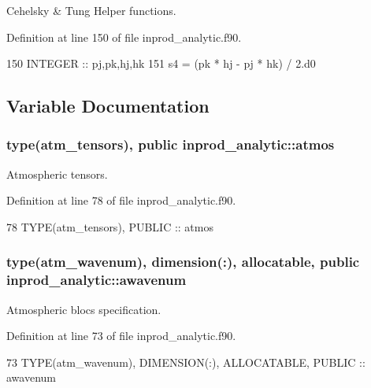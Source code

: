 Cehelsky \& Tung Helper functions. 



Definition at line 150 of file inprod\+\_\+analytic.\+f90.


\begin{DoxyCode}
150     \textcolor{keywordtype}{INTEGER} :: pj,pk,hj,hk
151     s4 = (pk * hj - pj * hk) / 2.d0
\end{DoxyCode}


\subsection{Variable Documentation}
\subsubsection[{\texorpdfstring{atmos}{atmos}}]{\setlength{\rightskip}{0pt plus 5cm}type({\bf atm\+\_\+tensors}), public inprod\+\_\+analytic\+::atmos}\hypertarget{namespaceinprod__analytic_a6f4fe9aa292d78b871e5498e411d1297}{}\label{namespaceinprod__analytic_a6f4fe9aa292d78b871e5498e411d1297}


Atmospheric tensors. 



Definition at line 78 of file inprod\+\_\+analytic.\+f90.


\begin{DoxyCode}
78   \textcolor{keywordtype}{TYPE}(atm\_tensors), \textcolor{keywordtype}{PUBLIC} :: atmos 
\end{DoxyCode}
\subsubsection[{\texorpdfstring{awavenum}{awavenum}}]{\setlength{\rightskip}{0pt plus 5cm}type({\bf atm\+\_\+wavenum}), dimension(\+:), allocatable, public inprod\+\_\+analytic\+::awavenum}\hypertarget{namespaceinprod__analytic_aa6b6ebedac44495720ffe649bc937a56}{}\label{namespaceinprod__analytic_aa6b6ebedac44495720ffe649bc937a56}


Atmospheric blocs specification. 



Definition at line 73 of file inprod\+\_\+analytic.\+f90.


\begin{DoxyCode}
73   \textcolor{keywordtype}{TYPE}(atm\_wavenum), \textcolor{keywordtype}{DIMENSION(:)}, \textcolor{keywordtype}{ALLOCATABLE}, \textcolor{keywordtype}{PUBLIC} :: awavenum 
\end{DoxyCode}
